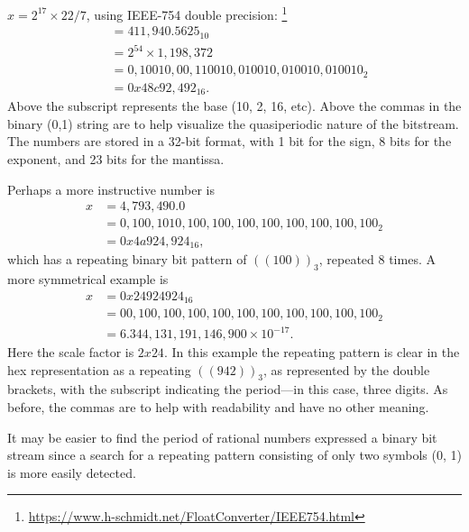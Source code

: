 \documentclass{ximera}
\begin{document}
 \label{eq:IEEE-754}
 

\BEx
$x=2^{17}\times 22/7$, using IEEE-754 double precision:%
 \footnote{{\url{https://www.h-schmidt.net/FloatConverter/IEEE754.html}}}
 \begin{align*}
 	&=411,940.5625_{10}  \\
	&= 2^{54} \times 1,198,372 \\
	&= 0,10010,00,110010,010010,010010,010010_2 \\
	 &= 0x48c92,492_{16}.
 \end{align*}
 Above the subscript represents the base (10, 2, 16, etc).
Above the commas in the binary (0,1) string are to help visualize the quasiperiodic nature of the bitstream. 
The numbers are stored in a 32-bit format, with 1 bit for the sign, 8 bits for the exponent, and 23 bits for the mantissa.

Perhaps a more instructive number is
 \begin{align*}
 x&=4,793,490.0\\
 &= 0,100,1010,100,100,100,100,100,100,100,100_{2}\\
 &= 0x4a924,924_{16},
 \end{align*}
which has a repeating binary bit pattern of $((100))_{3}$, repeated 8 times. %
A more symmetrical example is
 \begin{align*}
x &= 0x24924924_{16} \\
&= 00,100,100,100,100,100,100,100,100,100,100_{2} \\
&= 6.344,131,191,146,900 \times 10^{-17}.
 \end{align*}
Here the scale factor is $2x24$. In this example
the repeating pattern is clear in the hex representation as a repeating $((942))_{3}$, as
represented by the double brackets, with the subscript indicating the period---in this case, three digits. 
As before, the commas are to help with readability and have no other meaning.
\EEx


It may be easier to find the period of rational numbers expressed a binary bit stream since a search
for a repeating pattern consisting of only two symbols (0, 1) is more easily detected.
\end{document}
